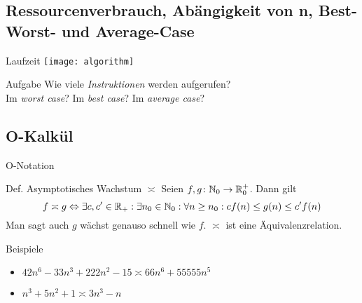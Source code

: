 \newcommand{\Rplus}{\ensuremath{\nR_+}}
\newcommand{\Rnullplus}{\ensuremath{\nR^+_0}}

\subsection{Ressourcenverbrauch, Abängigkeit von n, Best- Worst- und Average-Case}
\begin{frame}{Laufzeit}
\centering\texttt{[image: algorithm]}

\begin{exampleblock}{Aufgabe}
	Wie viele \emph{Instruktionen} werden aufgerufen? \\%
	\pause
	Im \emph{worst case}? Im \emph{best case}? Im \emph{average case}?
\end{exampleblock}
\end{frame}

\subsection{O-Kalkül}
\begin{frame}{O-Notation}
	\begin{block}{Def. Asymptotisches Wachstum $\asymp$}
		Seien $f,g \from \nN_0 \to \Rnullplus$. Dann gilt
		\[
			f \asymp g \Leftrightarrow \exists c,c'\in \Rplus: \exists n_0\in \nN_0: \forall n\geq n_0: c f(n) \leq g(n) \leq c' f(n)
		\]
		Man sagt auch $g$ wächst genauso schnell wie $f$. $\asymp$ ist eine Äquivalenzrelation.
	\end{block}

	\begin{exampleblock}{Beispiele}
		\begin{itemize}
			\item $42n^6-33n^3+222n^2 -15 \asymp 66n^6+55555n^5$
			\item $n^{3}+5n^2 + 1\asymp 3n^3-n$
		\end{itemize}
	\end{exampleblock}
\end{frame}

